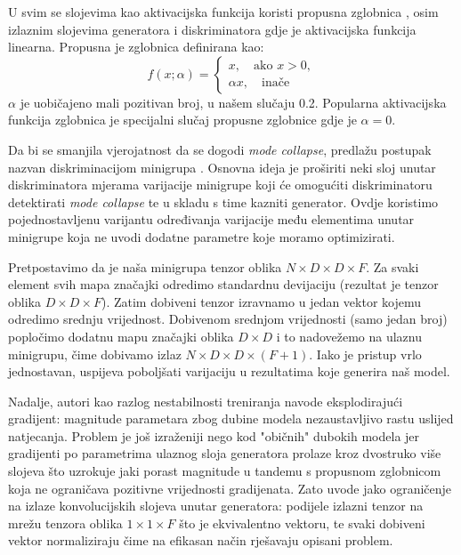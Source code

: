 U svim se slojevima kao aktivacijska funkcija koristi propusna zglobnica , osim izlaznim slojevima generatora i diskriminatora gdje je aktivacijska funkcija linearna. Propusna je zglobnica definirana kao:
\begin{equation*}
f(x; \alpha) = 
	\begin{cases}
		x, \quad \text{ako } x > 0,\\
		\alpha x, \quad \text{inače} 
	\end{cases}
\end{equation*}
$\alpha$ je uobičajeno mali pozitivan broj, u našem slučaju 0.2. Popularna aktivacijska funkcija zglobnica  je specijalni slučaj propusne zglobnice gdje je $\alpha = 0$.

Da bi se smanjila vjerojatnost da se dogodi \textit{mode collapse}, \citep{salimans2016improved} predlažu postupak nazvan diskriminacijom minigrupa . Osnovna ideja je proširiti neki sloj unutar diskriminatora mjerama varijacije minigrupe koji će omogućiti diskriminatoru detektirati \textit{mode collapse} te u skladu s time kazniti generator. Ovdje koristimo pojednostavljenu varijantu određivanja varijacije među elementima unutar minigrupe koja ne uvodi dodatne parametre koje moramo optimizirati.

Pretpostavimo da je naša minigrupa tenzor oblika $N \times D \times D \times F$. Za svaki element svih mapa značajki odredimo standardnu devijaciju (rezultat je tenzor oblika $D \times D \times F$). Zatim dobiveni tenzor izravnamo u jedan vektor kojemu odredimo srednju vrijednost. Dobivenom srednjom vrijednosti (samo jedan broj) popločimo dodatnu mapu značajki oblika $D \times D$ i to nadovežemo na ulaznu minigrupu, čime dobivamo izlaz $N \times D \times D \times (F + 1)$. Iako je pristup vrlo jednostavan, uspijeva poboljšati varijaciju u rezultatima koje generira naš model.

Nadalje, autori kao razlog nestabilnosti treniranja navode eksplodirajući gradijent: magnitude parametara zbog dubine modela nezaustavljivo rastu uslijed natjecanja. Problem je još izraženiji nego kod "običnih" dubokih modela jer gradijenti po parametrima ulaznog sloja generatora prolaze kroz dvostruko više slojeva što uzrokuje jaki porast magnitude u tandemu s propusnom zglobnicom koja ne ograničava pozitivne vrijednosti gradijenata. Zato uvode jako ograničenje na izlaze konvolucijskih slojeva unutar generatora: podijele izlazni tenzor na mrežu tenzora oblika $1 \times 1 \times F$ što je ekvivalentno vektoru, te svaki dobiveni vektor normaliziraju čime na efikasan način rješavaju opisani problem.

